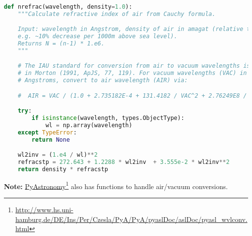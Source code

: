 \documentclass[12pt, a4paper]{article}
\begin{document}
\lstset{language=Pascal} 
\begin{lstlisting}[language=python, frame=single]  % Start your code-block

def nrefrac(wavelength, density=1.0):
    """Calculate refractive index of air from Cauchy formula.

    Input: wavelength in Angstrom, density of air in amagat (relative to STP,
    e.g. ~10% decrease per 1000m above sea level).
    Returns N = (n-1) * 1.e6. 
    """

    # The IAU standard for conversion from air to vacuum wavelengths is given
    # in Morton (1991, ApJS, 77, 119). For vacuum wavelengths (VAC) in
    # Angstroms, convert to air wavelength (AIR) via: 

    #  AIR = VAC / (1.0 + 2.735182E-4 + 131.4182 / VAC^2 + 2.76249E8 / VAC^4)

    try:
        if isinstance(wavelength, types.ObjectType):
            wl = np.array(wavelength)
    except TypeError:
        return None

    wl2inv = (1.e4 / wl)**2
    refracstp = 272.643 + 1.2288 * wl2inv  + 3.555e-2 * wl2inv**2
    return density * refracstp
\end{lstlisting}

\textbf{Note:} \href{http://www.hs.uni-hamburg.de/DE/Ins/Per/Czesla/PyA/PyA/pyaslDoc/aslDoc/pyasl_wvlconv.html}{PyAstronomy}\footnote{\url{http://www.hs.uni-hamburg.de/DE/Ins/Per/Czesla/PyA/PyA/pyaslDoc/aslDoc/pyasl_wvlconv.html}} also has functions to handle air/vacuum conversions. 
\end{document}
